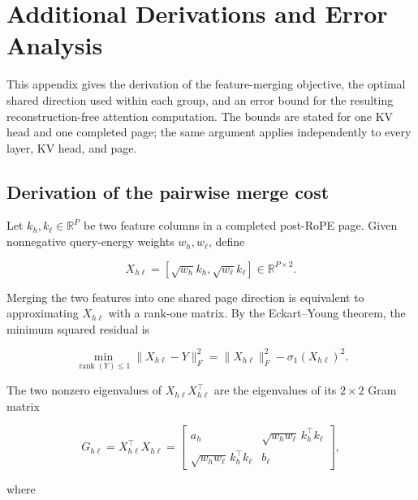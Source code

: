 \documentclass{article} %
\begin{document}



\appendix
\section{Additional Derivations and Error Analysis}

This appendix gives the derivation of the feature-merging objective, the
optimal shared direction used within each group, and an error bound for the
resulting reconstruction-free attention computation. The bounds are stated
for one KV head and one completed page; the same argument applies
independently to every layer, KV head, and page.

\subsection{Derivation of the pairwise merge cost}
\label{app:merge-derivation}

Let $k_h,k_\ell\in\mathbb{R}^{P}$ be two feature columns in a completed
post-RoPE page. Given nonnegative query-energy weights $w_h,w_\ell$, define

\begin{equation}
    X_{h\ell}=\left[\sqrt{w_h}k_h,\sqrt{w_\ell}k_\ell\right]
    \in\mathbb{R}^{P\times 2}.
\end{equation}

Merging the two features into one shared page direction is equivalent to
approximating $X_{h\ell}$ with a rank-one matrix. By the
Eckart--Young theorem, the minimum squared residual is

\begin{equation}
    \min_{\operatorname{rank}(Y)\leq 1}
    \|X_{h\ell}-Y\|_F^2
    =\|X_{h\ell}\|_F^2-\sigma_1(X_{h\ell})^2.
    \label{eq:app-ey}
\end{equation}

The two nonzero eigenvalues of $X_{h\ell}X_{h\ell}^{\top}$ are the
eigenvalues of its $2\times2$ Gram matrix

\begin{equation}
    G_{h\ell}=X_{h\ell}^{\top}X_{h\ell}
    =\begin{bmatrix}
        a_h & \sqrt{w_hw_\ell}\,k_h^{\top}k_\ell\\
        \sqrt{w_hw_\ell}\,k_h^{\top}k_\ell & b_\ell
      \end{bmatrix},
\end{equation}

where
\end{document}
